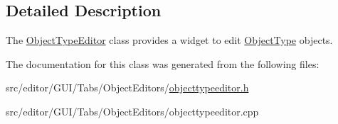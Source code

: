 \subsection{\-Detailed \-Description}
\-The \hyperlink{class_object_type_editor}{\-Object\-Type\-Editor} class provides a widget to edit \hyperlink{class_object_type}{\-Object\-Type} objects. 

\-The documentation for this class was generated from the following files\-:\begin{DoxyCompactItemize}
\item 
src/editor/\-G\-U\-I/\-Tabs/\-Object\-Editors/\hyperlink{objecttypeeditor_8h}{objecttypeeditor.\-h}\item 
src/editor/\-G\-U\-I/\-Tabs/\-Object\-Editors/objecttypeeditor.\-cpp\end{DoxyCompactItemize}
